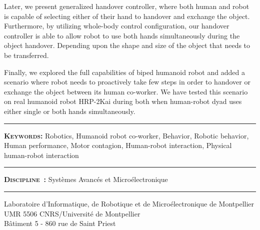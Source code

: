 Later, we present generalized handover controller, where both human and robot is capable of selecting either of their hand to handover and exchange the object. Furthermore, by utilizing whole-body control configuration, our handover controller is able to allow robot to use both hands simultaneously during the object handover. Depending upon the shape and size of the object that needs to be transferred.

Finally, we explored the full capabilities of biped humanoid robot and added a scenario where robot needs to proactively take few steps in order to handover or exchange the object between its human co-worker. We have tested this scenario on real humanoid robot HRP-2Kai during both when human-robot dyad uses either single or both hands simultaneously.











\vspace{3pt}\hrule\vspace{3pt}
\noindent \textbf{\textsc{Keywords:}}
Robotics, Humanoid robot co-worker, Behavior, Robotic behavior, Human performance, Motor contagion, Human-robot interaction, Physical human-robot interaction
\noindent \vspace{3pt}\hrule\vspace{3pt}
\noindent \textbf{\textsc{Discipline~:}}
Syst\`emes Avanc\'es et Micro\'electronique
\noindent \vspace{3pt}\hrule\vspace{3pt}
\noindent Laboratoire d'Informatique, de Robotique et de Micro\'electronique de Montpellier\\
UMR 5506 CNRS/Universit\'e de Montpellier\\
B\^atiment 5 - 860 rue de Saint Priest
